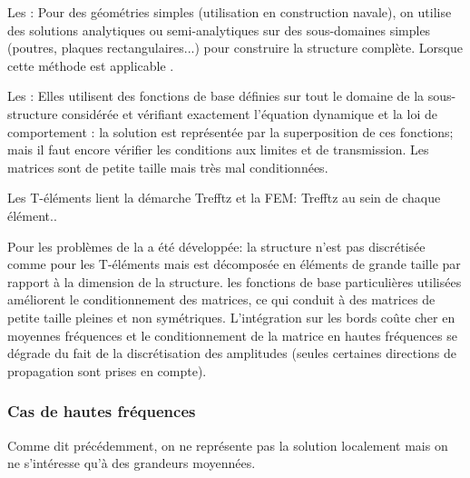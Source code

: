 \bigskip
Les :
Pour des géométries simples (utilisation en construction navale), on utilise des solutions
analytiques ou semi-analytiques sur des sous-domaines simples (poutres, plaques rectangulaires...)
pour construire la structure complète.
Lorsque cette méthode est applicable .

\bigskip
Les :
Elles utilisent des fonctions de base définies sur tout le domaine de la sous-structure considérée
et vérifiant exactement l'équation dynamique et la loi de comportement : la solution est représentée
par la superposition de ces fonctions; mais il faut encore vérifier les conditions aux limites et de
transmission.
Les matrices sont de petite taille mais très mal conditionnées.

Les T-éléments lient la démarche Trefftz et la FEM:
Trefftz au sein de chaque élément..

Pour les problèmes de  la 
a été développée:
la structure n'est pas discrétisée comme pour les T-éléments mais est décomposée en
éléments de grande taille par rapport à la dimension de la structure. les fonctions de base
particulières utilisées améliorent le conditionnement des matrices, ce qui conduit à des
matrices de petite taille pleines et non symétriques. L'intégration sur les bords coûte cher
en moyennes fréquences et le conditionnement de la matrice en hautes fréquences se dégrade du fait de la discrétisation des amplitudes
(seules certaines directions de propagation sont prises en compte).

\medskip
\subsubsection{Cas de hautes fréquences}
Comme dit précédemment, on ne représente pas la solution localement mais on ne
s'intéresse qu'à des grandeurs moyennées.

